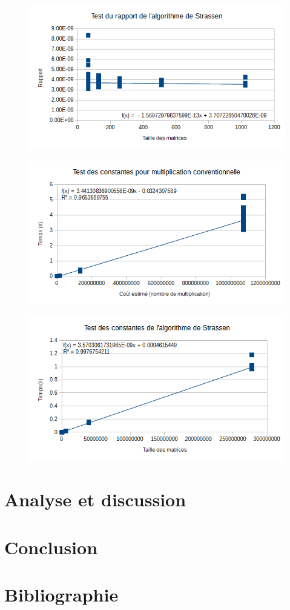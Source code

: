 \documentclass[a4paper, 12pt]{article} %
\begin{document}
\begin{figure}[H]
\centering
\includegraphics{Image/RapportStrassen.png}
\end{figure}

\begin{figure}[H]
\centering
\includegraphics{Image/ConstantesConventionnelle.png}
\end{figure}

\begin{figure}[H]
\centering
\includegraphics{Image/ConstantesStrassen.png}
\end{figure}

\section{Analyse et discussion}

\section{Conclusion}

\section{Bibliographie}
\end{document}
